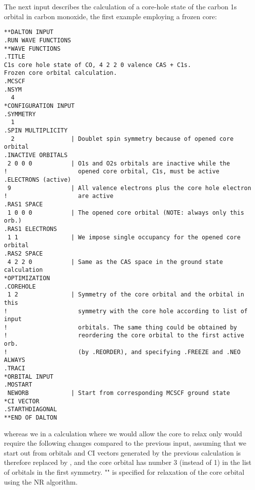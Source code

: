 \begin{center}
\end{center}

The next input describes the calculation of a core-hole
state of the carbon 1s orbital in carbon monoxide, the first
example employing a frozen core:

\begin{verbatim}
**DALTON INPUT
.RUN WAVE FUNCTIONS
**WAVE FUNCTIONS
.TITLE
C1s core hole state of CO, 4 2 2 0 valence CAS + C1s.
Frozen core orbital calculation.
.MCSCF
.NSYM
  4
*CONFIGURATION INPUT
.SYMMETRY
  1
.SPIN MULTIPLICITY
  2                | Doublet spin symmetry because of opened core orbital
.INACTIVE ORBITALS
 2 0 0 0           | O1s and O2s orbitals are inactive while the
!                    opened core orbital, C1s, must be active
.ELECTRONS (active)
 9                 | All valence electrons plus the core hole electron
!                    are active
.RAS1 SPACE
 1 0 0 0           | The opened core orbital (NOTE: always only this orb.)
.RAS1 ELECTRONS
 1 1               | We impose single occupancy for the opened core orbital
.RAS2 SPACE
 4 2 2 0           | Same as the CAS space in the ground state calculation
*OPTIMIZATION
.COREHOLE
 1 2               | Symmetry of the core orbital and the orbital in this
!                    symmetry with the core hole according to list of input
!                    orbitals. The same thing could be obtained by
!                    reordering the core orbital to the first active orb.
!                    (by .REORDER), and specifying .FREEZE and .NEO ALWAYS
.TRACI
*ORBITAL INPUT
.MOSTART
 NEWORB            | Start from corresponding MCSCF ground state
*CI VECTOR
.STARTHDIAGONAL
**END OF DALTON
\end{verbatim}
\label{sirius_ex6}


whereas we in a calculation where we would allow the core to
relax only would require the following changes
compared to the previous input, assuming that we start out from
orbitals and CI vectors generated by the previous calculation
 is therefore replaced by , and
the core orbital has number 3 (instead of 1) in the list of
orbitals in the first symmetry. "" is specified for
relaxation of the core orbital using the NR algorithm.

